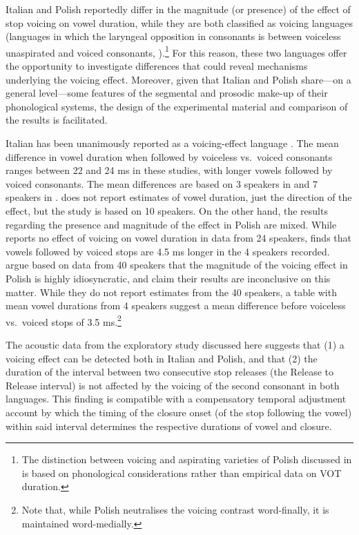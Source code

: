 \documentclass[12pt,]{article}
\let\rmarkdownfootnote\footnote%
\def\footnote{\protect\rmarkdownfootnote}
\begin{document}
Italian and Polish reportedly differ in the magnitude (or presence) of
the effect of stop voicing on vowel duration, while they are both
classified as voicing languages (languages in which the laryngeal
opposition in consonants is between voiceless unaspirated and voiced
consonants,
\citealt{beckman2013}).\footnote{The distinction between voicing and aspirating varieties of Polish discussed in \citet{cyran2011} is based on phonological considerations rather than empirical data on VOT duration.
} For this reason, these two languages offer the opportunity to
investigate differences that could reveal mechanisms underlying the
voicing effect. Moreover, given that Italian and Polish share---on a
general level---some features of the segmental and prosodic make-up of
their phonological systems, the design of the experimental material and
comparison of the results is facilitated.

Italian has been unanimously reported as a voicing-effect language
\citep{caldognetto1979, farnetani1986, esposito2002}. The mean
difference in vowel duration when followed by voiceless vs.~voiced
consonants ranges between 22 and 24 ms in these studies, with longer
vowels followed by voiced consonants. The mean differences are based on
3 speakers in \citealt{farnetani1986} and 7 speakers in
\citealt{esposito2002}. \citealt{caldognetto1979} does not report
estimates of vowel duration, just the direction of the effect, but the
study is based on 10 speakers. On the other hand, the results regarding
the presence and magnitude of the effect in Polish are mixed. While
\citet{keating1984} reports no effect of voicing on vowel duration in
data from 24 speakers, \citet{nowak2006} finds that vowels followed by
voiced stops are 4.5 ms longer in the 4 speakers recorded.
\citet{malisz2008} argue based on data from 40 speakers that the
magnitude of the voicing effect in Polish is highly idiosyncratic, and
claim their results are inconclusive on this matter. While they do not
report estimates from the 40 speakers, a table with mean vowel durations
from 4 speakers suggest a mean difference before voiceless vs.~voiced
stops of 3.5
ms.\footnote{Note that, while Polish neutralises the voicing contrast word-finally, it is maintained word-medially.}

The acoustic data from the exploratory study discussed here suggests
that (1) a voicing effect can be detected both in Italian and Polish,
and that (2) the duration of the interval between two consecutive stop
releases (the Release to Release interval) is not affected by the
voicing of the second consonant in both languages. This finding is
compatible with a compensatory temporal adjustment account by which the
timing of the closure onset (of the stop following the vowel) within
said interval determines the respective durations of vowel and closure.
\end{document}

